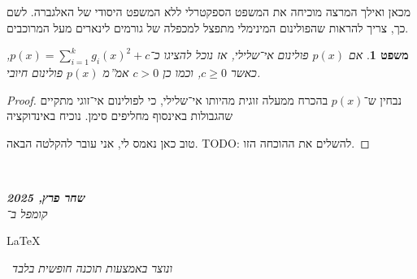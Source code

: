 \documentclass[]{article}
\newcommand\en[1] {\begin{otherlanguage}{english}#1\end{otherlanguage}}
\newcommand\ndoc  {\dotfill \\ \vfil {\begin{center}
			{\textbf{\textit{שחר פרץ, 2025}} \\
				\scriptsize \textit{קומפל ב־}\en{\LaTeX}\,\textit{ ונוצר באמצעות תוכנה חופשית בלבד}}
	\end{center}} \vfil	}
\newtheorem{Theorem}{משפט}
\theoremstyle{definition}
\newcommand\theo  [1] {\begin{Theorem}#1\end{Theorem}}
\begin{document}
	מכאן ואילך המרצה מוכיחה את המשפט הספקטרלי ללא המשפט היסודי של האלגברה. לשם כך, צריך להראות שהפולינום המינימלי מתפצל למכפלה של גורמים לינארים מעל המרוכבים. 
	
	\theo{אם $p(x)$ פולינום אי־שלילי, אז נוכל להציגו כ־$p(x) = \sum_{i = 1}^{k}g_i(x)^2 + c$, כאשר $c \ge 0$, וכמו כן $c > 0$ אמ''מ $p(x)$ פולינום חיובי. }\begin{proof}
		נבחין ש־$p(x)$ בהכרח ממעלה זוגית מהיותו אי־שלילי, כי לפולינום אי־זוגי מתקיים שהגבולות באינסוף מחליפים סימן. נוכיח באינדוקציה 
		
		טוב כאן נאמס לי, אני עובר להקלטה הבאה. 
		TODO: להשלים את ההוכחה הזו. 
	\end{proof}
	
	\ndoc
\end{document}
